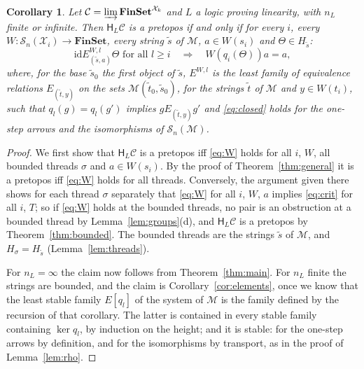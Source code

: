 \documentclass[11pt]{amsart}
\newtheorem{cor}[thm]{Corollary}
\theoremstyle{definition}
\newcommand{\Fin}{\mathbf{FinSet}}
\newcommand{\HH}{\mathsf H}
\newcommand{\cX}{\mathcal X}
\newcommand{\cC}{\mathcal C}
\newcommand{\cM}{\mathcal M}
\newcommand{\cS}{\mathcal S}
\newcommand{\id}{\mathrm{id}}
\begin{document}
\begin{cor}\label{cor:crit}
Let $\cC=\varinjlim\Fin^{\cX_k}$ and $L$ a logic proving linearity,
with $n_L$ finite or infinite. Then $\HH_L\cC$ is a pretopos if and
only if for every $i$, every $W\colon\cS_n(\cX_i)\to\Fin$, every
string $\tilde s$ of $\cM$, $a\in W(s_i)$ and $\Theta\in H_{\tilde
s}$:
\[
\id\mathrel{E^{W,l}_{(\tilde s,a)}}\Theta\text{ for all }l\ge i
\quad\Longrightarrow\quad W(q_i(\Theta))a=a,
\]
where, for the base $\tilde s_0$ the first object of $\tilde s$,
$E^{W,l}$ is the least family of equivalence relations
$E_{(\tilde t,y)}$ on the sets $\cM(\tilde t_0,\tilde s_0)$, for the
strings $\tilde t$ of $\cM$ and $y\in W(t_i)$, such that
$q_l(g)=q_l(g')$ implies $g\mathrel{E_{(\tilde t,y)}}g'$ and
\eqref{eq:closed} holds for the one-step arrows and the isomorphisms
of $\cS_n(\cM)$.
\end{cor}
\begin{proof}
We first show that $\HH_L\cC$ is a pretopos iff \eqref{eq:W} holds
for all $i$, $W$, all bounded threads $\sigma$ and $a\in W(s_i)$. By
the proof of Theorem~\ref{thm:general} it is a pretopos iff
\eqref{eq:W} holds for all threads. Conversely, the argument given
there shows for each thread $\sigma$ separately that \eqref{eq:W} for
all $i$, $W$, $a$ implies \eqref{eq:crit} for all $i$, $T$; so if
\eqref{eq:W} holds at the bounded threads, no pair is an obstruction
at a bounded thread by Lemma~\ref{lem:groups}(d), and $\HH_L\cC$ is a
pretopos by Theorem~\ref{thm:bounded}. The bounded threads are the
strings $\tilde s$ of $\cM$, and $H_\sigma=H_{\tilde s}$
(Lemma~\ref{lem:threads}).

For $n_L=\infty$ the claim now follows from Theorem~\ref{thm:main}.
For $n_L$ finite the strings are bounded, and the claim is
Corollary~\ref{cor:elements}, once we know that the least stable
family $E[q_l]$ of the system of $\cM$ is the family defined by the
recursion of that corollary. The latter is contained in every stable
family containing $\ker q_l$, by induction on the height; and it is
stable: for the one-step arrows by definition, and for the
isomorphisms by transport, as in the proof of Lemma~\ref{lem:rho}.
\end{proof}
\end{document}
